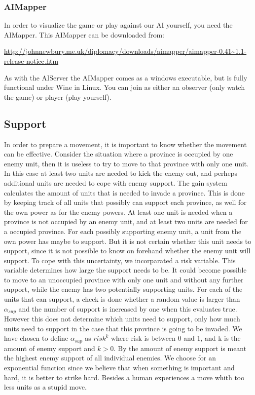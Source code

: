 \documentclass[a4paper]{article} %
\begin{document}
\subsubsection{AIMapper}
In order to visualize the game or play against our AI yourself, you need the AIMapper. This AIMapper can be downloaded from: 

\begin{sloppypar}
\noindent\url{http://johnnewbury.me.uk/diplomacy/downloads/aimapper/aimapper-0.41~1.1-release-notice.htm}
\end{sloppypar}

As with the AIServer the AIMapper comes as a windows executable, but is fully functional under Wine in Linux. You can join as either an observer (only watch the game) or player (play yourself). 


\subsection{Support}

In order to prepare a movement, it is important to know whether the movement can be effective. Consider the situation where a province is occupied by one enemy unit, then it is useless to try to move to that province with only one unit. In this case at least two units are needed to kick the enemy out, and perheps additional units are needed to cope with enemy support. The gain system calculates the amount of units that is needed to invade a province. This is done by keeping track of all units that possibly can support each province, as well for the own power as for the enemy powers. At least one unit is needed when a province is not occupied by an enemy unit, and at least two units are needed for a occupied province. For each possibly supporting enemy unit, a unit from the own power has maybe to support. But it is not certain whether this unit needs to support, since it is not possible to know on forehand whether the enemy unit will support. To cope with this uncertainty, we incorparated a risk variable. This variable determines how large the support needs to be. It could become possible to move to an unoccupied province with only one unit and without any further support, while the enemy has two potentially supporting units. For each of the units that can support, a check is done whether a random value is larger than $\alpha_{sup}$ and the number of support is increased by one when this evaluates true. However this does not determine which units need to support, only how much units need to support in the case that this province is going to be invaded. We have chosen to define $\alpha_{sup}$ as $risk^{k}$ where risk is between 0 and 1, and k is the amount of enemy support and $k>0$. By the amount of enemy support is meant the highest enemy support of all individual enemies. We choose for an exponential function since we believe that when something is important and hard, it is better to strike hard. Besides a human experiences a move whith too less units as a stupid move. 
\end{document}
